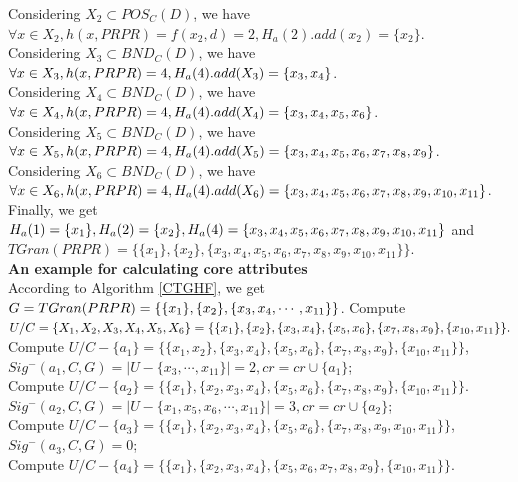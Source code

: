 \documentclass[review]{elsarticle}
\begin{document}
		Considering $X_2 \subset POS_C(D)$, we have $\forall x \in X_2, h(x,PRPR)=f(x_2,d)=2, H_a(2).add(x_2)=\{x_2\}$.\\
		Considering $X_3 \subset BND_C(D)$, we have $\forall x \in X_3, h(x,PRPR)=4, H_a(4).add(X_3)\\=\{x_3,x_4\}$.\\
		Considering $X_4 \subset BND_C(D)$, we have $\forall x \in X_4, h(x,PRPR)=4, H_a(4).add(X_4)\\=\{x_3,x_4,x_5,x_6\}$.\\
		Considering $X_5 \subset BND_C(D)$, we have $\forall x \in X_5, h(x,PRPR)=4, H_a(4).add(X_5)\\=\{x_3,x_4,x_5,x_6,x_7,x_8,x_9\}$.\\
		Considering $X_6 \subset BND_C(D)$, we have $\forall x \in X_6, h(x,PRPR)=4, H_a(4).add(X_6)\\=\{x_3,x_4,x_5,x_6,x_7,x_8,x_9,x_{10},x_{11}\}$.\\
		Finally, we get $H_a(1)=\{x_1\},H_a(2)=\{x_2\},H_a(4)=\{x_3,x_4,x_5,x_6,x_7,x_8,x_9,x_{10},\\x_{11}\}$ and $TGran(PRPR)=\{\{x_1\},\{x_2\},\{x_3,x_4,x_5,x_6,x_7,x_8,x_9,x_{10},x_{11}\}\}$.
		\\\textbf{An example for calculating core attributes}\\%
		According to Algorithm \ref{CTGHF}, we get $G=TGran(PRPR)=\{\{x_1\},\{x_2\},\{x_3,x_4,\cdots,\\x_{11}\}\}$.
		Compute $U/C=\lbrace X_{1},X_{2},X_{3},X_{4},X_{5},X_{6} \rbrace=\lbrace \lbrace x_{1} \rbrace,\lbrace x_{2} \rbrace,\lbrace x_{3},x_{4} \rbrace,\lbrace x_{5},x_{6} \rbrace,\\
		\lbrace x_{7},x_{8},x_{9} \rbrace,\lbrace x_{10},x_{11} \rbrace \rbrace.$\\
		Compute $U/C-\{a_1\}=\{\{x_1,x_2\},\{x_3,x_4\},\{x_5,x_6\},\{x_7,x_8,x_9\},\{x_{10},x_{11}\}\}$,\\
		$Sig^-(a_1,C,G)=|U-\{x_3,\cdots,x_{11}\}|=2, cr=cr\cup \{a_1\}$;\\
		Compute $U/C-\{a_2\}=\{\{x_1\},\{x_2,x_3,x_4\},\{x_5,x_6\},\{x_7,x_8,x_9\},\{x_{10},x_{11}\}\}$. \\
		$Sig^-(a_2,C,G)=|U-\{x_1,x_5,x_6,\cdots,x_{11}\}|=3, cr=cr\cup \{a_2\}$;\\
		Compute $U/C-\{a_3\}=\{\{x_1\},\{x_2,x_3,x_4\},\{x_5,x_6\},\{x_7,x_8,x_9,x_{10},x_{11}\}\}$,\\
		$Sig^-(a_3,C,G)=0$;\\
		Compute $U/C-\{a_4\}=\{\{x_1\},\{x_2,x_3,x_4\},\{x_5,x_6,x_7,x_8,x_9\},\{x_{10},x_{11}\}\}$.\\
\end{document}
